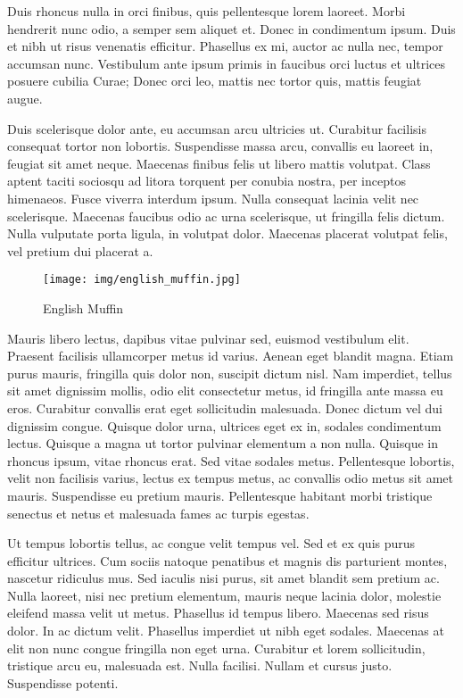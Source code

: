 \documentclass{llncs}
\begin{document}
Duis rhoncus nulla in orci finibus, quis pellentesque lorem laoreet. Morbi hendrerit nunc odio, a semper sem aliquet et. Donec in condimentum ipsum. Duis et nibh ut risus venenatis efficitur. Phasellus ex mi, auctor ac nulla nec, tempor accumsan nunc. Vestibulum ante ipsum primis in faucibus orci luctus et ultrices posuere cubilia Curae; Donec orci leo, mattis nec tortor quis, mattis feugiat augue.

Duis scelerisque dolor ante, eu accumsan arcu ultricies ut. Curabitur facilisis consequat tortor non lobortis. Suspendisse massa arcu, convallis eu laoreet in, feugiat sit amet neque. Maecenas finibus felis ut libero mattis volutpat. Class aptent taciti sociosqu ad litora torquent per conubia nostra, per inceptos himenaeos. Fusce viverra interdum ipsum. Nulla consequat lacinia velit nec scelerisque. Maecenas faucibus odio ac urna scelerisque, ut fringilla felis dictum. Nulla vulputate porta ligula, in volutpat dolor. Maecenas placerat volutpat felis, vel pretium dui placerat a.

\begin{figure}[h!]
	\begin{center}
	\texttt{[image: img/english\_muffin.jpg]}
	\caption{English Muffin \cite{Muffin:2015}}
	\label{fig:english_muffin}
	\end{center}
\end{figure}

Mauris libero lectus, dapibus vitae pulvinar sed, euismod vestibulum elit. Praesent facilisis ullamcorper metus id varius. Aenean eget blandit magna. Etiam purus mauris, fringilla quis dolor non, suscipit dictum nisl. Nam imperdiet, tellus sit amet dignissim mollis, odio elit consectetur metus, id fringilla ante massa eu eros. Curabitur convallis erat eget sollicitudin malesuada. Donec dictum vel dui dignissim congue. Quisque dolor urna, ultrices eget ex in, sodales condimentum lectus. Quisque a magna ut tortor pulvinar elementum a non nulla. Quisque in rhoncus ipsum, vitae rhoncus erat. Sed vitae sodales metus. Pellentesque lobortis, velit non facilisis varius, lectus ex tempus metus, ac convallis odio metus sit amet mauris. Suspendisse eu pretium mauris. Pellentesque habitant morbi tristique senectus et netus et malesuada fames ac turpis egestas.

Ut tempus lobortis tellus, ac congue velit tempus vel. Sed et ex quis purus efficitur ultrices. Cum sociis natoque penatibus et magnis dis parturient montes, nascetur ridiculus mus. Sed iaculis nisi purus, sit amet blandit sem pretium ac. Nulla laoreet, nisi nec pretium elementum, mauris neque lacinia dolor, molestie eleifend massa velit ut metus. Phasellus id tempus libero. Maecenas sed risus dolor. In ac dictum velit. Phasellus imperdiet ut nibh eget sodales. Maecenas at elit non nunc congue fringilla non eget urna. Curabitur et lorem sollicitudin, tristique arcu eu, malesuada est. Nulla facilisi. Nullam et cursus justo. Suspendisse potenti.
\end{document}
